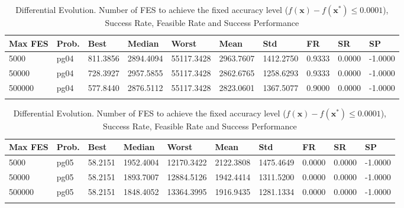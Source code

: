 \documentclass[10pt, a4paper]{book}
\begin{document}
\begin{center}
\begin{longtable}{l l l l l l l l l l}
\textbf{Max FES} & \textbf{Prob.} & \textbf{Best} & \textbf{Median} & \textbf{Worst} & \textbf{Mean} & \textbf{Std} & \textbf{FR} & \textbf{SR} & \textbf{SP} \\
\hline
5000 & pg04 & 811.3856 & 2894.4094 & 55117.3428 & 2963.7607 & 1412.2750 & 0.9333 & 0.0000 & -1.0000 \\
50000 & pg04 & 728.3927 & 2957.5855 & 55117.3428 & 2862.6765 & 1258.6293 & 0.9333 & 0.0000 & -1.0000 \\
500000 & pg04 & 577.8440 & 2876.5112 & 55117.3428 & 2823.0601 & 1367.5077 & 0.9000 & 0.0000 & -1.0000 \\

\caption{ Differential Evolution. Number of FES to achieve the fixed accuracy level ($f(\mathbf{x}) - f(\mathbf{x}^{*}) \leq 0.0001$), Success Rate, Feasible Rate and Success Performance }
\end{longtable}
\end{center}

\begin{center}
\begin{longtable}{l l l l l l l l l l}
\textbf{Max FES} & \textbf{Prob.} & \textbf{Best} & \textbf{Median} & \textbf{Worst} & \textbf{Mean} & \textbf{Std} & \textbf{FR} & \textbf{SR} & \textbf{SP} \\
\hline
5000 & pg05 & 58.2151 & 1952.4004 & 12170.3422 & 2122.3808 & 1475.4649 & 0.0000 & 0.0000 & -1.0000 \\
50000 & pg05 & 58.2151 & 1893.7007 & 12884.5126 & 1942.4414 & 1311.5200 & 0.0000 & 0.0000 & -1.0000 \\
500000 & pg05 & 58.2151 & 1848.4052 & 13364.3995 & 1916.9435 & 1281.1334 & 0.0000 & 0.0000 & -1.0000 \\

\caption{ Differential Evolution. Number of FES to achieve the fixed accuracy level ($f(\mathbf{x}) - f(\mathbf{x}^{*}) \leq 0.0001$), Success Rate, Feasible Rate and Success Performance }
\end{longtable}
\end{center}
\end{document}
